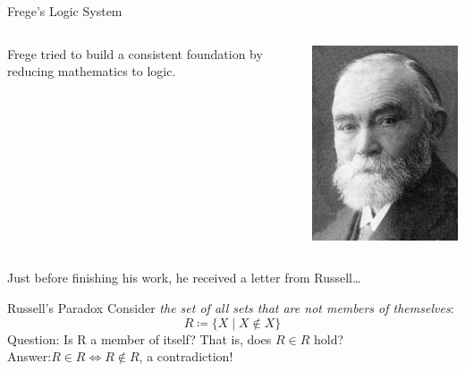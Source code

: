 \documentclass{beamer}
\begin{document}
\begin{frame}{Frege's Logic System}
	\begin{columns}[c,onlytextwidth]
	 \begin{column}{.70\textwidth}
		Frege tried to build a consistent foundation by reducing mathematics to logic.
	 \end{column}
	 \begin{column}{.25\textwidth}
		\includegraphics[width=\textwidth]{img/frege.jpg}
	 \end{column}
	\end{columns}
	\vspace{\baselineskip}
	\pause
	\centering Just before finishing his work, he received a letter from Russell\ldots
\end{frame}
\begin{frame}{Russell's Paradox}
	Consider \emph{the set of all sets that are not members of themselves}:
	\begin{equation*}
		R\coloneqq\{X\mid X\notin X\}
	\end{equation*}\pause
	Question: Is R a member of itself? That is, does $R\in R$ hold?\pause\\
	\vspace{\baselineskip}
	Answer:\hspace{4.3em}$R\in R \iff R\notin R$, a contradiction!
\end{frame}
\end{document}
